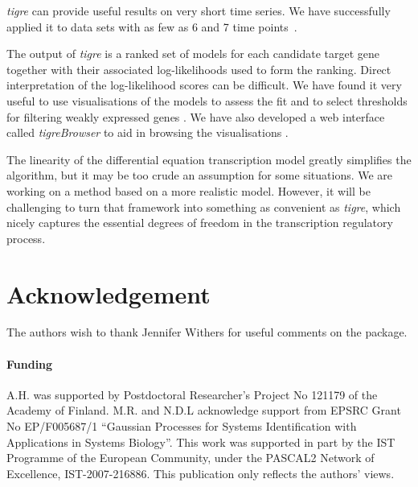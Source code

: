\documentclass{bioinfo}
\newcommand{\tigre}{\emph{tigre}}
\begin{document}
\tigre{} can provide useful results on very short time series.  We
have successfully applied it to data sets with as few as 6 and 7 time
points~\citep{Honkela2010PNAS,Honkela2010MLSP}.

The output of \tigre{} is a ranked set of models for each candidate
target gene together with their associated log-likelihoods used to
form the ranking.  Direct interpretation of the log-likelihood scores
can be difficult.  We have found it very useful to use visualisations
of the models to assess the fit and to select thresholds for filtering
weakly expressed genes \citep[for details, see][]{Honkela2010PNAS}.
We have also developed a web interface called \emph{tigreBrowser} to
aid in browsing the visualisations \citep{Matikainen2010tigreBrowser}.

The linearity of the differential equation transcription model greatly
simplifies the algorithm, but it may be too crude an assumption for some
situations.  We are working on a method based on a more realistic
model.  However, it will be challenging to turn that framework into
something as convenient as \tigre{}, which nicely captures the
essential degrees of freedom in the transcription regulatory process.

\section*{Acknowledgement}

The authors wish to thank Jennifer Withers for useful comments on the
package.

\paragraph{Funding\textcolon}
A.H. was supported by Postdoctoral Researcher's Project No 121179 of the Academy of Finland.
M.R. and N.D.L acknowledge support from EPSRC Grant No EP/F005687/1 ``Gaussian Processes for Systems Identification with Applications in Systems Biology''. 
This work was supported in part by the IST Programme of the European Community, under the PASCAL2 Network of Excellence, IST-2007-216886. This publication only reflects the authors' views.

\small



\end{document}
